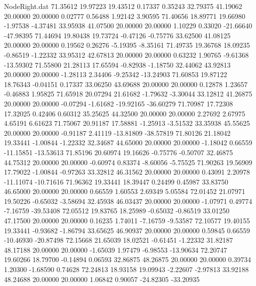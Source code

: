 \begin{filecontents}{NodeRight.dat}
  71.35612   19.97223   19.43512     0.17337    0.35243   32.79375   41.19062   20.00000   20.00000    0.02777    0.56488    1.92142    3.90595
  71.40656   18.89771   19.66980    -1.97538   -4.37481   33.95938   41.07500   20.00000   20.00000    1.10229    0.33020  -21.66640  -47.98395
  71.44694   19.80438   19.73724    -0.47126   -0.75776   33.62500   41.08125   20.00000   20.00000    0.19562    0.26276   -5.19395   -8.35161
  71.49735   19.36768   18.09235    -0.86519   -1.22332   33.95312   42.67813   20.00000   20.00000    0.63232    1.90765   -9.61368  -13.59302
  71.55800   21.28113   17.65594    -0.82938   -1.18750   32.44062   43.92813   20.00000   20.00000   -1.28113    2.34406   -9.25342  -13.24903
  71.60853   19.87122   18.76343    -0.04151    0.17337   33.06250   43.69688   20.00000   20.00000    0.12878    1.23657   -0.46883    1.95825
  71.65918   20.07294   21.61682    -1.79632   -3.30044   33.12812   41.26875   20.00000   20.00000   -0.07294   -1.61682  -19.92165  -36.60279
  71.70987   17.72308   17.32025     0.42406    0.60312   35.25625   44.32500   20.00000   20.00000    2.27692    2.67975    4.65191    6.61623
  71.75067   20.91187   17.58881    -1.25913   -3.51532   33.35938   45.55625   20.00000   20.00000   -0.91187    2.41119  -13.81809  -38.57819
  71.80126   21.18042   19.33441    -1.00844   -1.22332   32.34687   44.65000   20.00000   20.00000   -1.18042    0.66559  -11.15851  -13.53613
  71.85196   20.60974   19.16626    -0.75776   -0.50707   32.46875   44.75312   20.00000   20.00000   -0.60974    0.83374   -8.60056   -5.75525
  71.90263   19.56909   17.79022    -1.00844   -0.97263   33.32812   46.31562   20.00000   20.00000    0.43091    2.20978  -11.11074  -10.71616
  71.96362   19.33441   18.39447     0.24499    0.45987   33.83750   46.65000   20.00000   20.00000    0.66559    1.60553    2.69349    5.05584
  72.01452   21.07971   19.50226    -0.65032   -3.58694   32.45938   46.03437   20.00000   20.00000   -1.07971    0.49774   -7.16759  -39.53408
  72.05512   19.83765   18.25989    -0.65032   -0.86519   33.01250   47.17500   20.00000   20.00000    0.16235    1.74011   -7.16759   -9.53587
  72.10577   19.40155   19.33441    -0.93682   -1.86794   33.65625   46.90937   20.00000   20.00000    0.59845    0.66559  -10.46930  -20.87498
  72.15668   21.65039   18.02521    -0.61451   -1.22332   31.82187   48.17188   20.00000   20.00000   -1.65039    1.97479   -6.98553  -13.90634
  72.20747   19.60266   18.79700    -0.14894    0.06593   32.86875   48.26875   20.00000   20.00000    0.39734    1.20300   -1.68590    0.74628
  72.24813   18.93158   19.09943    -2.22607   -2.97813   33.92188   48.24688   20.00000   20.00000    1.06842    0.90057  -24.82305  -33.20935

\end{filecontents}
